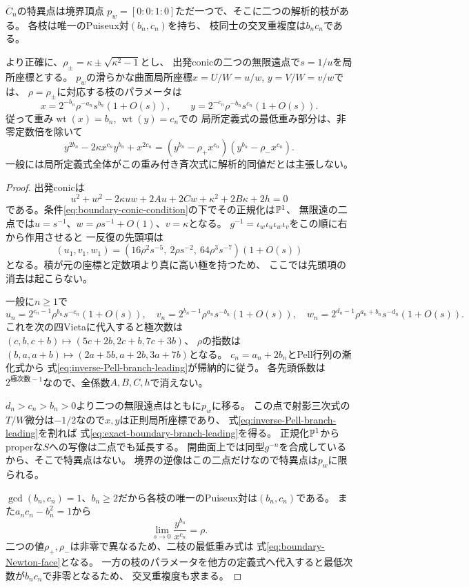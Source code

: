 \begin{theorem}[Pell数をPuiseux対に持つ二枝]
\label{thm:two-boundary-Puiseux}
$\overline C_n$の特異点は境界頂点
$p_w=[0:0:1:0]$ただ一つで、そこに二つの解析的枝がある。
各枝は唯一のPuiseux対$(b_n,c_n)$を持ち、
枝同士の交叉重複度は$b_nc_n$である。

より正確に、$\rho_\pm=\kappa\pm\sqrt{\kappa^2-1}$とし、
出発conicの二つの無限遠点で$s=1/u$を局所座標とする。
$p_w$の滑らかな曲面局所座標$x=U/W=u/w$, $y=V/W=v/w$では、
$\rho=\rho_\pm$に対応する枝のパラメータは
\begin{equation}\label{eq:exact-boundary-branch-leading}
 x=2^{-b_n}\rho^{-a_n}s^{b_n}(1+O(s)),\qquad
 y=2^{-c_n}\rho^{-b_n}s^{c_n}(1+O(s)).
\end{equation}
従って重み$\operatorname{wt}(x)=b_n$, $\operatorname{wt}(y)=c_n$での
局所定義式の最低重み部分は、非零定数倍を除いて
\begin{equation}\label{eq:boundary-Newton-face}
 y^{2b_n}-2\kappa x^{c_n}y^{b_n}+x^{2c_n}
 =(y^{b_n}-\rho_+x^{c_n})(y^{b_n}-\rho_-x^{c_n}).
\end{equation}
一般には局所定義式全体がこの重み付き斉次式に解析的同値だとは主張しない。
\end{theorem}
\begin{proof}
出発conicは
\[
 u^2+w^2-2\kappa uw+2Au+2Cw+\kappa^2+2B\kappa+2h=0
\]
である。条件\eqref{eq:boundary-conic-condition}の下でその正規化は$\mathbb P^1$、
無限遠の二点では$u=s^{-1}$、$w=\rho s^{-1}+O(1)$、$v=\kappa$となる。
$g^{-1}=\iota_w\iota_u\iota_w\iota_v$をこの順に右から作用させると
一反復の先頭項は
\[
 (u_1,v_1,w_1)=
 (16\rho^2s^{-5},\ 2\rho s^{-2},\ 64\rho^3s^{-7})(1+O(s))
\]
となる。積が元の座標と定数項より真に高い極を持つため、
ここでは先頭項の消去は起こらない。

一般に$n\ge1$で
\begin{equation}\label{eq:inverse-Pell-branch-leading}
 u_n=2^{c_n-1}\rho^{b_n}s^{-c_n}(1+O(s)),\quad
 v_n=2^{b_n-1}\rho^{a_n}s^{-b_n}(1+O(s)),\quad
 w_n=2^{d_n-1}\rho^{a_n+b_n}s^{-d_n}(1+O(s)).
\end{equation}
これを次の四Vietaに代入すると極次数は
$(c,b,c+b)\mapsto(5c+2b,2c+b,7c+3b)$、
$\rho$の指数は
$(b,a,a+b)\mapsto(2a+5b,a+2b,3a+7b)$となる。
$c_n=a_n+2b_n$とPell行列の漸化式から
式\eqref{eq:inverse-Pell-branch-leading}が帰納的に従う。
各先頭係数は$2^{\text{極次数}-1}$なので、全係数$A,B,C,h$で消えない。

$d_n>c_n>b_n>0$より二つの無限遠点はともに$p_w$に移る。
この点で射影三次式の$T/W$微分は$-1/2$なので$x,y$は正則局所座標であり、
式\eqref{eq:inverse-Pell-branch-leading}を割れば
式\eqref{eq:exact-boundary-branch-leading}を得る。
正規化$\mathbb P^1$からproperな$S$への写像は二点でも延長する。
開曲面上では同型$g^{-n}$を合成しているから、そこで特異点はない。
境界の逆像はこの二点だけなので特異点は$p_w$に限られる。

$\gcd(b_n,c_n)=1$、$b_n\ge2$だから各枝の唯一のPuiseux対は$(b_n,c_n)$である。
また$ a_nc_n-b_n^2=1$から
\[
 \lim_{s\to0}\frac{y^{b_n}}{x^{c_n}}=\rho.
\]
二つの値$\rho_+,\rho_-$は非零で異なるため、二枝の最低重み式は
式\eqref{eq:boundary-Newton-face}となる。
一方の枝のパラメータを他方の定義式へ代入すると最低次数が$b_nc_n$で非零となるため、
交叉重複度も求まる。
\end{proof}

